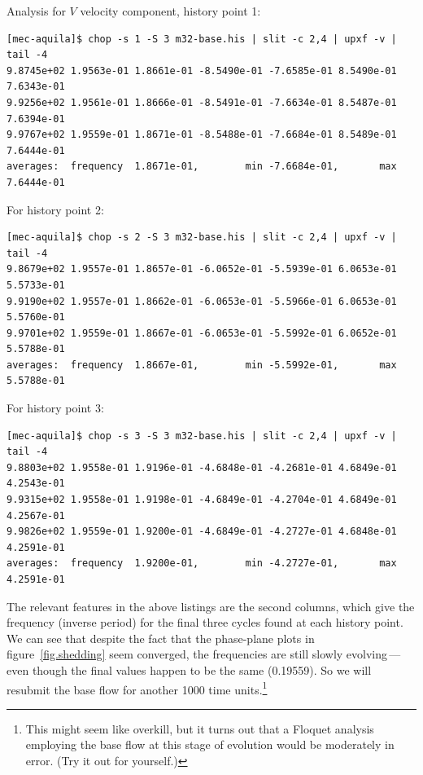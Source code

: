 \documentclass[11pt,a4paper]{report}
\begin{document}
Analysis for $V$ velocity component, history point 1:
\begin{verbatim}
[mec-aquila]$ chop -s 1 -S 3 m32-base.his | slit -c 2,4 | upxf -v | tail -4 
9.8745e+02 1.9563e-01 1.8661e-01 -8.5490e-01 -7.6585e-01 8.5490e-01 7.6343e-01
9.9256e+02 1.9561e-01 1.8666e-01 -8.5491e-01 -7.6634e-01 8.5487e-01 7.6394e-01
9.9767e+02 1.9559e-01 1.8671e-01 -8.5488e-01 -7.6684e-01 8.5489e-01 7.6444e-01
averages:  frequency  1.8671e-01,        min -7.6684e-01,       max 7.6444e-01
\end{verbatim}

For history point 2:
\begin{verbatim}
[mec-aquila]$ chop -s 2 -S 3 m32-base.his | slit -c 2,4 | upxf -v | tail -4 
9.8679e+02 1.9557e-01 1.8657e-01 -6.0652e-01 -5.5939e-01 6.0653e-01 5.5733e-01
9.9190e+02 1.9557e-01 1.8662e-01 -6.0653e-01 -5.5966e-01 6.0653e-01 5.5760e-01
9.9701e+02 1.9559e-01 1.8667e-01 -6.0653e-01 -5.5992e-01 6.0652e-01 5.5788e-01
averages:  frequency  1.8667e-01,        min -5.5992e-01,       max 5.5788e-01
\end{verbatim}

For history point 3:
\begin{verbatim}
[mec-aquila]$ chop -s 3 -S 3 m32-base.his | slit -c 2,4 | upxf -v | tail -4 
9.8803e+02 1.9558e-01 1.9196e-01 -4.6848e-01 -4.2681e-01 4.6849e-01 4.2543e-01
9.9315e+02 1.9558e-01 1.9198e-01 -4.6849e-01 -4.2704e-01 4.6849e-01 4.2567e-01
9.9826e+02 1.9559e-01 1.9200e-01 -4.6849e-01 -4.2727e-01 4.6848e-01 4.2591e-01
averages:  frequency  1.9200e-01,        min -4.2727e-01,       max 4.2591e-01
\end{verbatim}

The relevant features in the above listings are the second columns,
which give the frequency (inverse period) for the final three cycles
found at each history point.  We can see that despite the fact that
the phase-plane plots in figure~\ref{fig.shedding} seem converged, the
frequencies are still slowly evolving\,---\,even though the final
values happen to be the same (0.19559).  So we will resubmit the base
flow for another 1000 time units.\footnote{This might seem like
  overkill, but it turns out that a Floquet analysis employing the
  base flow at this stage of evolution would be moderately in error.
  (Try it out for yourself.)}
\end{document}
